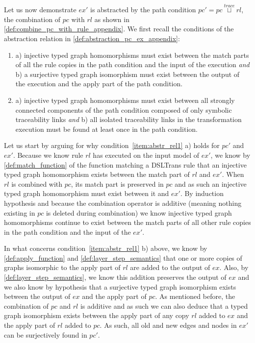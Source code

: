 \begin{ps}
\begin{itemize}
Let us now demonstrate $ex'$ is abstracted by the path condition $pc'=pc\stackrel{trace}{\sqcup} rl$, the combination of $pc$ with $rl$ as shown in \cref{def:combine_pc_with_rule_appendix}. We first recall the conditions of the abstraction relation in \cref{def:abstraction_pc_ex_appendix}:
\begin{enumerate}
	\item\label{item:abstr_rel1} a) injective typed graph homomorphisms must exist between the match parts of all the rule copies in the path condition and the input of the execution \emph{and} b) a surjective typed graph isomorphism must exist between the output of the execution and the apply part of the path condition.
    \item\label{item:abstr_rel2} a) injective typed graph homomorphisms must exist between all strongly connected components of the path condition composed of only symbolic traceability links \emph{and} b) all isolated traceability links in the transformation execution must be found at least once in the path condition.\vspace{.3cm}
\end{enumerate} 

Let us start by arguing for why condition~\ref{item:abstr_rel1} a) holds for $pc'$ and $ex'$. Because we know rule $rl$ has executed on the input model of $ex'$, we know by \cref{def:match_function} of the function matching a DSLTrans rule that an injective typed graph homomorphism exists between the match part of $rl$ and $ex'$. When $rl$ is combined with $pc$, its match part is preserved in $pc$ and as such an injective typed graph homomorphism must exist between it and $ex'$. By induction hypothesis and because the combination operator is additive (meaning nothing existing in $pc$ is deleted during combination) we know injective typed graph homomorphisms continue to exist between the match parts of all other rule copies in the path condition and the input of the $ex'$.\vspace{.3cm}

In what concerns condition~\ref{item:abstr_rel1} b) above, we know by \cref{def:apply_function} and \cref{def:layer_step_semantics} that one or more copies of graphs isomorphic to the apply part of $rl$ are added to the output of $ex$. Also, by \cref{def:layer_step_semantics}, we know this addition preserves the output of $ex$ and we also know by hypothesis that a surjective typed graph isomorphism exists between the output of $ex$ and the apply part of $pc$. As mentioned before, the combination of $pc$ and $rl$ is additive and as such we can also deduce that a typed graph isomorphism exists between the apply part of any copy $rl$ added to $ex$ and the apply part of $rl$ added to $pc$. As such, all old and new edges and nodes in $ex'$ can be surjectively found in $pc'$.\vspace{.3cm}


\end{itemize}
\end{ps}
